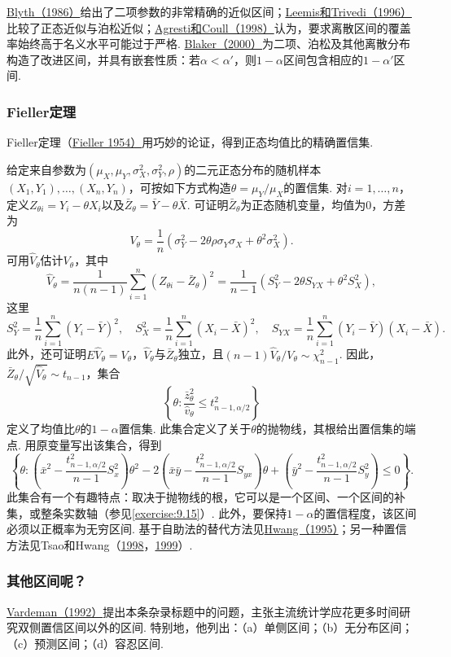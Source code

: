 \hyperref[bib:source39]{Blyth（1986）}给出了二项参数的非常精确的近似区间；\hyperref[bib:source196]{Leemis和Trivedi（1996）}比较了正态近似与泊松近似；\hyperref[bib:source3]{Agresti和Coull（1998）}认为，要求离散区间的覆盖率始终高于名义水平可能过于严格. \hyperref[bib:source37]{Blaker（2000）}为二项、泊松及其他离散分布构造了改进区间，并具有嵌套性质：若$\alpha<\alpha'$，则$1-\alpha$区间包含相应的$1-\alpha'$区间.
\subsubsection{Fieller定理}\label{sec:9.5.3}
Fieller定理（\hyperref[bib:source121]{Fieller 1954）}用巧妙的论证，得到正态均值比的精确置信集.

给定来自参数为$(\mu_X,\allowbreak\mu_Y,\allowbreak\sigma_X^2,\allowbreak\sigma_Y^2,\allowbreak\rho)$的二元正态分布的随机样本$(X_1,Y_1),\allowbreak\ldots,\allowbreak(X_n,Y_n)$，可按如下方式构造$\theta=\mu_Y/\mu_X$的置信集. 对$i=1,\ldots,n$，定义$Z_{\theta i}=Y_i-\theta X_i$以及$\bar Z_\theta=\bar Y-\theta\bar X$. 可证明$\bar Z_\theta$为正态随机变量，均值为$0$，方差为
$$V_\theta=\frac1n(\sigma_Y^2-2\theta\rho\sigma_Y\sigma_X+\theta^2\sigma_X^2).$$
可用$\hat V_\theta$估计$V_\theta$，其中
$$\hat V_\theta=\frac1{n(n-1)}\sum_{i=1}^n(Z_{\theta i}-\bar Z_\theta)^2=\frac1{n-1}(S_Y^2-2\theta S_{YX}+\theta^2S_X^2),$$
这里
$$S_Y^2=\frac1n\sum_{i=1}^n(Y_i-\bar Y)^2,\quad S_X^2=\frac1n\sum_{i=1}^n(X_i-\bar X)^2,\quad S_{YX}=\frac1n\sum_{i=1}^n(Y_i-\bar Y)(X_i-\bar X).$$
此外，还可证明$E\hat V_\theta=V_\theta$，$\hat V_\theta$与$\bar Z_\theta$独立，且$(n-1)\hat V_\theta/V_\theta\sim\chi^2_{n-1}$. 因此，$\bar Z_\theta/\sqrt{\hat V_\theta}\sim t_{n-1}$，集合
$$\left\{\theta:\frac{\bar z_\theta^2}{\hat v_\theta}\le t^2_{n-1,\alpha/2}\right\}$$
定义了均值比$\theta$的$1-\alpha$置信集. 此集合定义了关于$\theta$的抛物线，其根给出置信集的端点. 用原变量写出该集合，得到
$$\left\{\theta:\left(\bar x^2-\frac{t^2_{n-1,\alpha/2}}{n-1}S_x^2\right)\theta^2-2\left(\bar x\bar y-\frac{t^2_{n-1,\alpha/2}}{n-1}S_{yx}\right)\theta+\left(\bar y^2-\frac{t^2_{n-1,\alpha/2}}{n-1}S_y^2\right)\le0\right\}.$$
此集合有一个有趣特点：取决于抛物线的根，它可以是一个区间、一个区间的补集，或整条实数轴（参见\autoref{exercise:9.15}）. 此外，要保持$1-\alpha$的置信程度，该区间必须以正概率为无穷区间. 基于自助法的替代方法见\hyperref[bib:source175]{Hwang（1995）}；另一种置信方法见Tsao和Hwang（\hyperref[bib:source316]{1998}，\hyperref[bib:source317]{1999}）.
\subsubsection{其他区间呢？}\label{sec:9.5.4}
\hyperref[bib:source321]{Vardeman（1992）}提出本条杂录标题中的问题，主张主流统计学应花更多时间研究双侧置信区间以外的区间. 特别地，他列出：（a）单侧区间；（b）无分布区间；（c）预测区间；（d）容忍区间.

